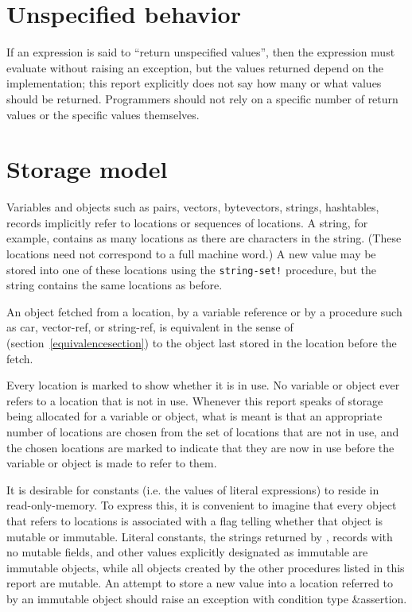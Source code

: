 \section{Unspecified behavior}

\vest If an expression is said to ``return unspecified values'',
then the expression must evaluate without raising an exception, but
the values returned depend on the implementation; this report
explicitly does not say how many or what values should be returned.
Programmers should not rely on a specific number of return values or
the specific values themselves.


\section{Storage model}
\label{storagemodel}

Variables and objects such as pairs, vectors, bytevectors, strings, hashtables, records implicitly
refer to locations or sequences of locations.  A string, for
example, contains as many locations as there are characters in the string. 
(These locations need not correspond to a full machine word.) A new value may be
stored into one of these locations using the {\tt string-set!} procedure, but
the string contains the same locations as before.

An object fetched from a location, by a variable reference or by
a procedure such as {\cf car}, {\cf vector-ref}, or {\cf string-ref}, is
equivalent in the sense of  %
(section~\ref{equivalencesection})
to the object last stored in the location before the fetch.

Every location is marked to show whether it is in use.
No variable or object ever refers to a location that is not in use.
Whenever this report speaks of storage being allocated for a variable
or object, what is meant is that an appropriate number of locations are
chosen from the set of locations that are not in use, and the chosen
locations are marked to indicate that they are now in use before the variable
or object is made to refer to them.

It is desirable for constants (i.e. the values of
literal expressions) to reside in read-only-memory.  To express this,
it is convenient to imagine that every object that refers to locations
is associated with a flag telling whether that object is
mutable or immutable.  Literal
constants, the strings returned by , records with
no mutable fields, and other values explicitly designated as immutable
are immutable objects, while all objects created by the other
procedures listed in this report are mutable.  An attempt to store a
new value into a location referred to by an immutable object
should raise an exception with condition type {\cf\&assertion}.


